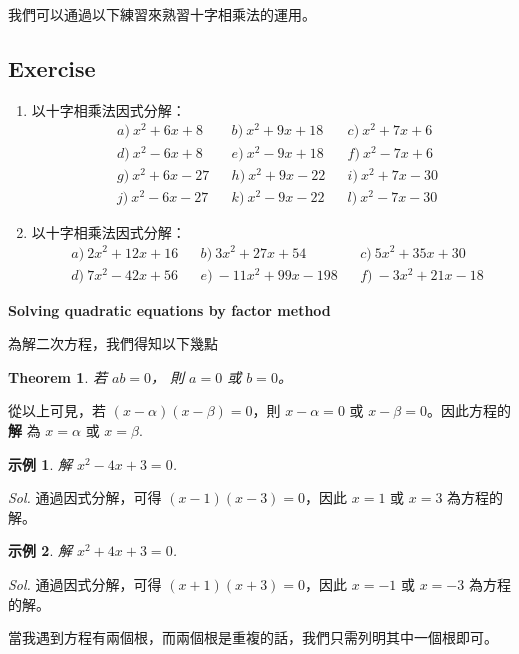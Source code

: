 \documentclass[12pt]{article}
\newtheorem*{theorem}{Theorem}
\newtheorem{example}{示例}
\begin{document}
    我們可以通過以下練習來熟習十字相乘法的運用。

    \subsection*{Exercise}
    \begin{enumerate}
        \item 以十字相乘法因式分解：\begin{align*}
            &a)\ x^2+6x+8&&b)\ x^2+9x+18&&c)\ x^2+7x+6\\
            &d)\ x^2-6x+8&&e)\ x^2-9x+18&&f)\ x^2-7x+6\\
            &g)\ x^2+6x-27&&h)\ x^2+9x-22&&i)\ x^2+7x-30\\
            &j)\ x^2-6x-27&&k)\ x^2-9x-22&&l)\ x^2-7x-30
        \end{align*}
        \item 以十字相乘法因式分解：\begin{align*}
            &a)\ 2x^2+12x+16&&b)\ 3x^2+27x+54&&c)\ 5x^2+35x+30\\
            &d)\ 7x^2-42x+56&&e)\ -11x^2+99x-198&&f)\ -3x^2+21x-18
        \end{align*}
    \end{enumerate}

    \begin{center}
        \textbf{Solving quadratic equations by factor method}
    \end{center}

    為解二次方程，我們得知以下幾點\begin{theorem}
        若 $ab=0$， 則 $a=0$ 或 $b=0$。
    \end{theorem}

    從以上可見，若 $(x-\alpha)(x-\beta)=0$，則 $x-\alpha=0$ 或 $x-\beta=0$。因此方程的 \textbf{解} 為 $x=\alpha$ 或 $x=\beta$.

    \begin{example}
        解 $x^2-4x+3=0$.
    \end{example}

    \textit{ Sol. }通過因式分解，可得 $(x-1)(x-3)=0$，因此 $x=1$ 或 $x=3$ 為方程的解。

    \begin{example}
        解 $x^2+4x+3=0$.
    \end{example}

    \textit{ Sol. }通過因式分解，可得 $(x+1)(x+3)=0$，因此 $x=-1$ 或 $x=-3$ 為方程的解。

    當我遇到方程有兩個根，而兩個根是重複的話，我們只需列明其中一個根即可。
\end{document}
